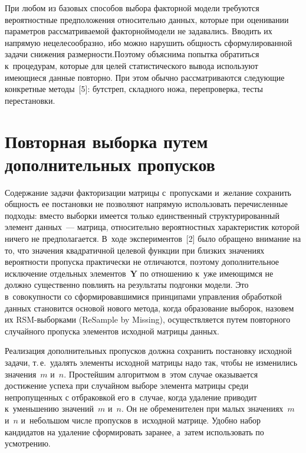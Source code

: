 \begin{multicols}{2}
     При любом из базовых способов выбора факторной модели требуются 
вероятностные предположения относительно данных, которые при оценивании 
параметров рассматриваемой факторной\linebreak модели не задавались. Вводить их 
напрямую нецелесообразно, ибо можно нарушить общность сформулированной 
задачи снижения размерности.\linebreak Поэтому объяснима попытка обратиться 
к~процедурам, которые для целей статистического вывода используют 
имеющиеся данные повторно. При этом обычно рассматриваются 
следующие конкретные методы~[5]: бутстреп, складного ножа, перепроверка, 
тесты перестановки.

\vspace*{-6pt}
     
\section{Повторная выборка путем дополнительных пропусков}

     Содержание задачи факторизации матрицы с~пропусками и~желание 
сохранить общность ее постановки не позволяют напрямую использовать 
перечисленные подходы: вместо выборки имеется только единственный 
структурированный элемент данных~--- матрица, относительно вероятностных 
характеристик которой ничего не предполагается. В~ходе экспериментов~[2] 
было обращено внимание на то, что значения квадратичной целевой функции 
при близких значениях вероятности пропуска практически не отличаются, 
поэтому дополнительное исключение отдельных элементов~$\mathbf{Y}$ по 
отношению к~уже имеющимся не должно существенно повлиять на результаты 
подгонки модели. Это в~совокупности со сформировавшимися принципами 
управления обработкой данных становится основой нового метода, когда 
образование выборок, назовем их RSM-выборками (ReSample by Missing), 
осуществляется путем повторного случайного пропуска элементов исходной 
матрицы данных. 
     
     Реализация дополнительных пропусков должна сохранить постановку 
исходной задачи, т.\,е.\ удалять элементы исходной матрицы надо так, чтобы не 
изменились значения~$m$ и~$n$. Простейшим алгоритмом в~этом случае 
оказывается достижение успеха при случайном выборе элемента матрицы 
среди непропущенных с отбраковкой его в~случае, когда удаление приводит 
к~уменьшению значений~$m$ и~$n$. Он не обременителен при малых 
значениях~$m$ и~$n$ и~небольшом числе пропусков в~исходной матрице. 
Удобно набор кандидатов на удаление сформировать заранее, а~затем 
использовать по усмотрению. 
     

\end{multicols}

